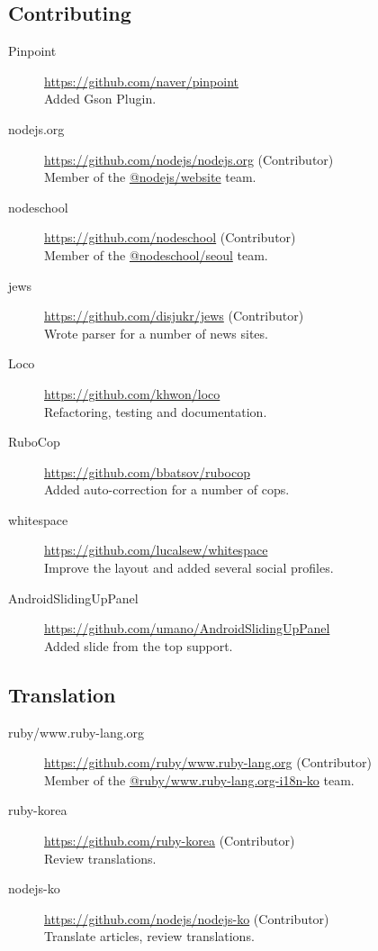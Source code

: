 \documentclass[a4paper,10pt]{article}
\begin{document}
\subsection{Contributing}
\begin{description}
  \item[Pinpoint] \url{https://github.com/naver/pinpoint} \\
    Added Gson Plugin.
  \item[nodejs.org] \url{https://github.com/nodejs/nodejs.org} (Contributor) \\
    Member of the \href{https://github.com/orgs/nodejs/teams/website}{@nodejs/website} team.
  \item[nodeschool] \url{https://github.com/nodeschool} (Contributor) \\
    Member of the \href{https://github.com/orgs/nodeschool/teams/seoul}{@nodeschool/seoul} team.
  \item[jews] \url{https://github.com/disjukr/jews} (Contributor) \\
    Wrote parser for a number of news sites.
  \item[Loco] \url{https://github.com/khwon/loco} \\
    Refactoring, testing and documentation.
  \item[RuboCop] \url{https://github.com/bbatsov/rubocop} \\
    Added auto-correction for a number of cops.
  \item[whitespace] \url{https://github.com/lucalsew/whitespace} \\
    Improve the layout and added several social profiles.
  \item[AndroidSlidingUpPanel] \url{https://github.com/umano/AndroidSlidingUpPanel} \\
    Added slide from the top support.
\end{description}

\subsection{Translation}
\begin{description}
  \item[ruby/www.ruby-lang.org] \url{https://github.com/ruby/www.ruby-lang.org} (Contributor) \\
    Member of the \href{https://github.com/orgs/ruby/teams/www-ruby-lang-org-i18n-ko}{@ruby/www.ruby-lang.org-i18n-ko} team.
  \item[ruby-korea] \url{https://github.com/ruby-korea} (Contributor) \\
    Review translations.
  \item[nodejs-ko] \url{https://github.com/nodejs/nodejs-ko} (Contributor) \\
    Translate articles, review translations.
\end{description}


\end{document}
